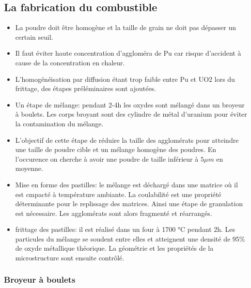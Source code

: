 \subsection{La fabrication du combustible}
\begin{itemize}

    \item La poudre doit être homogène et la taille de grain ne doit pas dépasser un certain seuil.
    \item Il faut éviter haute concentration d'aggloméra de Pu car risque d'accident à cause de la concentration en chaleur.
    \item L'homogénéisation par diffusion étant trop faible entre Pu et UO2 lors du frittage, des étapes préléminaires sont ajoutées.
    \item Un étape de mélange: pendant 2-4h les oxydes sont mélangé dans un broyeur à boulets. Les corps broyant sont des cylindre de métal d'uranium pour éviter la contamination du mélange.
    \item L'objectif de cette étape de réduire la taille des agglomérats pour atteindre une taille de poudre cible et un mélange homogène des poudres. En l'occurence on cherche à avoir une poudre de taille inférieur à $5\mu m$ en moyenne.
    \item Mise en forme des pastilles: le mélange est déchargé dans une matrice où il est cmpacté à température ambiante. La coulabilité est une propriété déterminante pour le replissage des matrices. Ainsi une étape de granulation est nécessaire. Les agglomérats sont alors fragmenté et réarrangés.
    \item frittage des pastilles: il est réalisé dans un four à 1700 °C pendant 2h. Les particules du mélange se soudent entre elles et atteignent une densité de 95\% de oxyde métallique théorique. La géométrie et les propriétés de la microstructure sont ensuite contrôlé.
\end{itemize}

\subsubsection{Broyeur à boulets}

